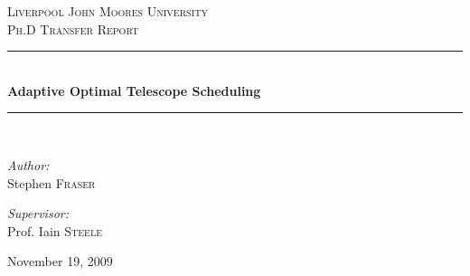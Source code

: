\documentclass[12pt,a4paper]{article}
\newcommand{\HRule}{\rule{\linewidth}{0.5mm}}
\begin{document}
\setlength{\parindent}{5mm}
\setlength{\parskip}{10pt plus2mm minus2mm}
\thispagestyle{empty}




\begin{titlepage}
 \begin{center}
 \textsc{\LARGE Liverpool John Moores University}\\[1.5cm]
 \textsc{\Large Ph.D Transfer Report}\\[0.5cm]
 \HRule \\[0.4cm]
 { \Large \bfseries Adaptive Optimal Telescope Scheduling}\\[0.4cm]
 \HRule \\[1.5cm]
\begin{minipage}{0.4\textwidth}
\begin{flushleft} \large
\emph{Author:}\\
Stephen \textsc{Fraser}
\end{flushleft}
\end{minipage}
\begin{minipage}{0.4\textwidth}
\begin{flushright} \large
\emph{Supervisor:} \\
Prof. Iain \textsc{Steele}
\end{flushright}
\end{minipage}
 \vfill
 {\large November 19, 2009} 
\end{center}
\end{titlepage}

\newpage
\listoffigures
\end{document}
